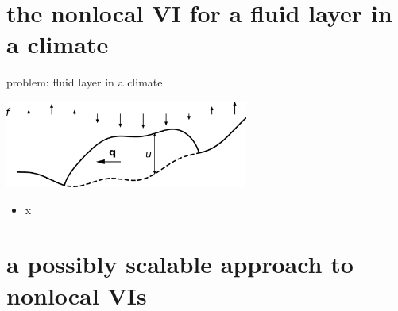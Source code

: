 \documentclass[svgnames,
               hyperref={colorlinks,citecolor=DeepPink4,linkcolor=FireBrick,urlcolor=Maroon},
               usepdftitle=false]  %
               {beamer}
\begin{document}
\section{the nonlocal VI for a fluid layer in a climate}

\begin{frame}{problem: fluid layer in a climate}

\begin{center}
\includegraphics[width=0.6\textwidth]{images/fluid-in-climate.png}
\end{center}

\begin{itemize}
\item x
\end{itemize}
\end{frame}


\section{a possibly scalable approach to nonlocal VIs}
\end{document}
